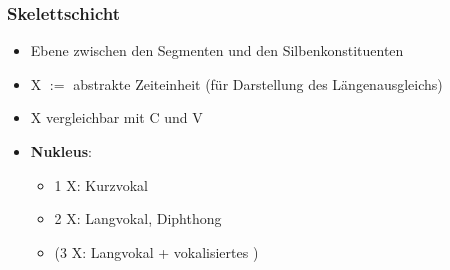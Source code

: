 
\begin{frame}[shrink]
\frametitle{Skelettschicht}

\begin{itemize}
	\item Ebene zwischen den Segmenten und den Silbenkonstituenten
	
	\item X $:=$ abstrakte Zeiteinheit (\zB für Darstellung des Längenausgleichs)
	
	\item X \ras vergleichbar mit C und V

	\item \textbf{Nukleus}:
	
	\begin{itemize}
		\item 1 X: Kurzvokal
		\item 2 X: Langvokal, Diphthong
		\item (3 X: Langvokal + vokalisiertes \textipa{/\textscr /})
	\end{itemize}
	
\end{itemize}


\begin{minipage}{.325\textwidth}

%
\centering
{}

\end{minipage}
%
\begin{minipage}{.325\textwidth}
%
\centering
{}

\end{minipage}
%
\begin{minipage}{.325\textwidth}
%
\centering
{}

\end{minipage}


\end{frame}



